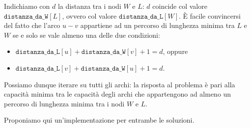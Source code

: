 Indichiamo con $d$ la distanza tra i nodi $W$ e $L$: $d$ coincide col valore $\texttt{distanza\_da\_W}[L]$, ovvero col valore $\texttt{distanza\_da\_L}[W]$. È facile convincersi del fatto che l'arco $u - v$ appartiene ad un percorso di lunghezza minima tra $L$ e $W$ se e solo se vale almeno una delle due condizioni:
\begin{itemize}[nolistsep, itemsep=2mm]
	\item $\texttt{distanza\_da\_L}[u] + \texttt{distanza\_da\_W}[v] + 1 = d$, oppure
	\item $\texttt{distanza\_da\_L}[v] + \texttt{distanza\_da\_W}[u] + 1 = d$.
\end{itemize}
Possiamo dunque iterare su tutti gli archi: la risposta al problema è pari alla capacità minima tra le capacità degli archi che appartengono ad almeno un percorso di lunghezza minima tra i nodi $W$ e $L$.

\newpage
{}
\Cppsol
Proponiamo qui un'implementazione per entrambe le soluzioni.\\[.2cm]
\SolUnaBfs
\colorbox{white}{}
\newpage
\SolDueBfs
\colorbox{white}{}

\afterpage{\nopagecolor}
